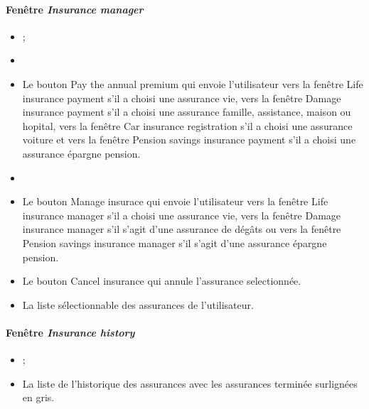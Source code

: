 \paragraph{Fenêtre \emph{Insurance manager}}
\begin{itemize}
\item {} ;
\item {}
\item Le bouton Pay the annual premium qui envoie l'utilisateur vers la fenêtre Life insurance payment s'il a choisi une assurance vie, vers la fenêtre Damage insurance payment s'il a choisi une assurance famille, assistance, maison ou hopital, vers la fenêtre Car insurance registration s'il a choisi une assurance voiture et vers la fenêtre Pension savings insurance payment s'il a choisi une assurance épargne pension.
\item {}
\item Le bouton Manage insurace qui envoie l'utilisateur vers la fenêtre Life insurance manager s'il a choisi une assurance vie, vers la fenêtre Damage insurance manager s'il s'agit d'une assurance de dégâts ou vers la fenêtre Pension savings insurance manager s'il s'agit d'une assurance épargne pension.
\item Le bouton Cancel insurance qui annule l'assurance selectionnée.
\item La liste sélectionnable des assurances de l'utilisateur.
\end{itemize}


\paragraph{Fenêtre \emph{Insurance history}}
\begin{itemize}
\item {} ;
\item La liste de l'historique des assurances avec les assurances terminée surlignées en gris.
\end{itemize}


